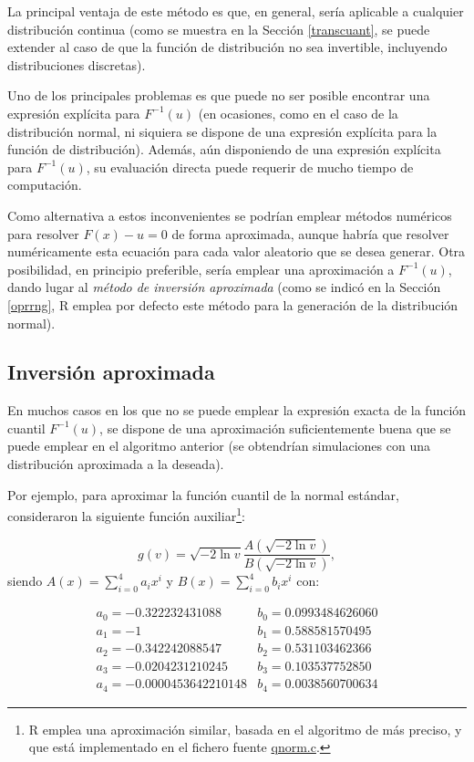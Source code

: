 \documentclass[
  10pt,
]{book}
\theoremstyle{break}
\theoremstyle{nonumberplain}
\let\oldfootnote\footnote
\renewcommand\footnote[1]{\oldfootnote{\hspace{2mm}#1}}
\begin{document}
La principal ventaja de este método es que, en general, sería aplicable a cualquier distribución continua (como se muestra en la Sección \ref{transcuant}, se puede extender al caso de que la función de distribución no sea invertible, incluyendo distribuciones discretas).

Uno de los principales problemas es que puede no ser posible encontrar una expresión explícita para \(F^{-1}( u )\) (en ocasiones, como en el caso de la distribución normal, ni siquiera se dispone de una expresión explícita para la función de distribución).
Además, aún disponiendo de una expresión explícita para \(F^{-1}( u )\), su evaluación directa puede requerir de mucho tiempo de computación.

Como alternativa a estos inconvenientes se podrían emplear métodos numéricos para resolver \(F(x) - u = 0\) de forma aproximada, aunque habría que resolver numéricamente esta ecuación para cada valor aleatorio que se desea generar.
Otra posibilidad, en principio preferible, sería emplear una aproximación a \(F^{-1}( u )\), dando lugar al \emph{método de inversión aproximada} (como se indicó en la Sección \ref{oprrng}, R emplea por defecto este método para la generación de la distribución normal).

\hypertarget{inversiuxf3n-aproximada}{%
\subsection{Inversión aproximada}\label{inversiuxf3n-aproximada}}

En muchos casos en los que no se puede emplear la expresión exacta de la función cuantil \(F^{-1}( u )\), se dispone de una aproximación suficientemente buena que se puede emplear en el algoritmo anterior (se obtendrían simulaciones con una distribución aproximada a la deseada).

Por ejemplo, para aproximar la función cuantil de la normal estándar, \citet{odeh1974} consideraron la siguiente función auxiliar\footnote{R emplea una aproximación similar, basada en el algoritmo de \citet{wichura1988} más preciso, y que está implementado en el fichero fuente \href{https://svn.r-project.org/R/trunk/src/nmath/qnorm.c}{qnorm.c}.}:

\[ g\left( v\right)  =\sqrt{-2\ln v}\frac{A\left( \sqrt{-2\ln v}\right)
}{B\left( \sqrt{-2\ln v}\right)  },\]
siendo \(A(x) =\sum_{i=0}^{4}a_{i}x^{i}\)
y \(B(x) =\sum_{i=0}^{4}b_{i}x^{i}\) con:

\[\begin{array}{ll}
a_{0}=-0.322232431088 &  b_{0}=0.0993484626060 \\
a_{1}=-1 &  b_{1}=0.588581570495 \\
a_{2}=-0.342242088547 & b_{2}=0.531103462366 \\
a_{3}=-0.0204231210245 & b_{3}=0.103537752850 \\
a_{4}=-0.0000453642210148 & b_{4}=0.0038560700634
\end{array}\]
\end{document}
